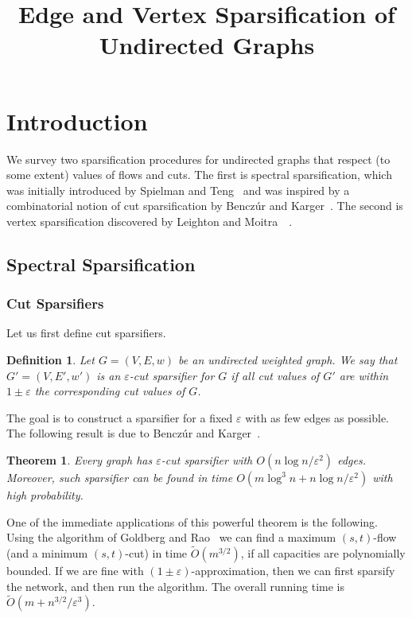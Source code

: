 \documentclass[12pt]{article}
\newcommand{\eps}{\varepsilon}
\newtheorem{theorem}{Theorem}
\newtheorem{definition}{Definition}
\begin{document}
    \title{Edge and Vertex Sparsification of Undirected Graphs}
    \date{}
    \maketitle

    \section{Introduction}
    We survey two sparsification procedures for undirected graphs that respect
    (to some extent) values of flows and cuts.
    The first is spectral sparsification,
    which was initially introduced by Spielman and Teng~\cite{ST11} and was
    inspired by a combinatorial notion of cut sparsification by Bencz\'{u}r and
    Karger~\cite{BK96}.
    The second is vertex sparsification discovered by Leighton and
    Moitra~\cite{M09}~\cite{LM10}.
    \subsection{Spectral Sparsification}
    \subsubsection{Cut Sparsifiers}
    Let us first define cut sparsifiers.
    \begin{definition}
        Let $G = (V, E, w)$ be an undirected weighted graph.
        We say that $G' = (V, E', w')$ is an $\eps$-cut sparsifier
        for $G$ if all cut values of $G'$ are within
        $1 \pm \eps$ the corresponding cut values of $G$.
    \end{definition}
    The goal is to construct a sparsifier for a fixed $\eps$ with as few edges as possible.
    The following result is due to Bencz\'{u}r and Karger~\cite{BK96}.
    \begin{theorem}
        \label{benczur_karger}
        Every graph has $\eps$-cut sparsifier with $O(n \log n / \eps^2)$ edges.
        Moreover, such sparsifier can be found in time
        $O(m \log^3 n + n \log n / \eps^2)$ with high probability.
    \end{theorem}
    One of the immediate applications of this powerful theorem is the following.
    Using the algorithm of Goldberg and Rao~\cite{GR98} we can find a maximum $(s, t)$-flow
    (and a minimum $(s, t)$-cut)
    in time $\tilde{O}(m^{3/2})$, if all capacities are polynomially bounded.
    If we are fine with $(1 \pm \eps)$-approximation, then we can first sparsify the network,
    and then run the algorithm. The overall running time is
    $\tilde{O}(m + n^{3/2} / \eps^3)$.
\end{document}
